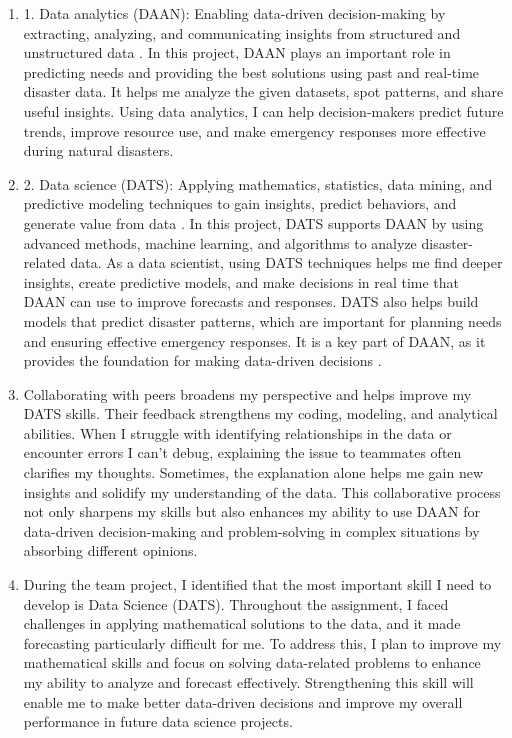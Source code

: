 \documentclass[a4paper, 11pt]{report}
\begin{document}
\begin{enumerate}
	\item 1. Data analytics (DAAN): Enabling data-driven decision-making by extracting, analyzing, and communicating insights from structured and unstructured data \cite{palma2023}. In this project, DAAN plays an important role in predicting needs and providing the best solutions using past and real-time disaster data. It helps me analyze the given datasets, spot patterns, and share useful insights. Using data analytics, I can help decision-makers predict future trends, improve resource use, and make emergency responses more effective during natural disasters.


	\item 2. Data science (DATS): Applying mathematics, statistics, data mining, and predictive modeling techniques to gain insights, predict behaviors, and generate value from data \cite{palma2023}. In this project, DATS supports DAAN by using advanced methods, machine learning, and algorithms to analyze disaster-related data. As a data scientist, using DATS techniques helps me find deeper insights, create predictive models, and make decisions in real time that DAAN can use to improve forecasts and responses. DATS also helps build models that predict disaster patterns, which are important for planning needs and ensuring effective emergency responses. It is a key part of DAAN, as it provides the foundation for making data-driven decisions \cite{anderson2008}.


	\item Collaborating with peers broadens my perspective and helps improve my DATS skills. Their feedback strengthens my coding, modeling, and analytical abilities. When I struggle with identifying relationships in the data or encounter errors I can't debug, explaining the issue to teammates often clarifies my thoughts. Sometimes, the explanation alone helps me gain new insights and solidify my understanding of the data. This collaborative process not only sharpens my skills but also enhances my ability to use DAAN for data-driven decision-making and problem-solving in complex situations by absorbing different opinions.

	\item During the team project, I identified that the most important skill I need to develop is Data Science (DATS). Throughout the assignment, I faced challenges in applying mathematical solutions to the data, and it made forecasting particularly difficult for me. To address this, I plan to improve my mathematical skills and focus on solving data-related problems to enhance my ability to analyze and forecast effectively. Strengthening this skill will enable me to make better data-driven decisions and improve my overall performance in future data science projects.




\end{enumerate}
\end{document}
